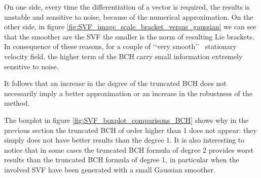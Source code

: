 On one side, every time the differentiation of a vector is required, the results is unstable and sensitive to noise, because of the numerical approximation. On the other side, in figure \ref{fig:SVF_image_scale_bracket_versus_gaussian} we can see that the smoother are the SVF the smaller is the norm of resulting Lie brackets. In consequence of these reasons, for a couple of \lq\lq very smooth\rq\rq~ stationary velocity field, the higher term of the BCH carry small information extremely sensitive to noise.

It follows that an increase in the degree of the truncated BCH does not necessarily imply a better approximation or an increase in the robustness of the method. 

The boxplot in figure \ref{fig:SVF_boxplot_comparisons_BCH} shows why in the previous section the truncated BCH of order higher than 1 does not appear: they simply does not have better results than the degree 1. It is also interesting to notice that in some cases the truncated BCH formula of degree 2 provides worst results than the truncated BCH formula of degree 1, in particular when the involved SVF have been generated with a small Gaussian smoother.

